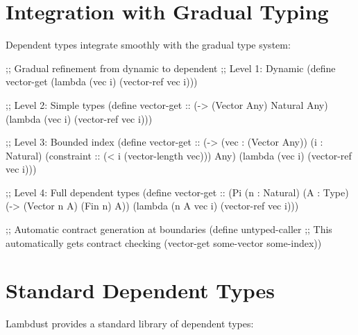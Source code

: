 \section{Integration with Gradual Typing}
\label{sec:dependent-gradual}


Dependent types integrate smoothly with the gradual type system:

\begin{example}
\begin{lambdustcode}
;; Gradual refinement from dynamic to dependent
;; Level 1: Dynamic  
(define vector-get 
  (lambda (vec i) (vector-ref vec i)))

;; Level 2: Simple types
(define vector-get :: (-> (Vector Any) Natural Any)
  (lambda (vec i) (vector-ref vec i)))

;; Level 3: Bounded index
(define vector-get :: (-> (vec : (Vector Any)) 
                          (i : Natural)  
                          (constraint :: (< i (vector-length vec)))
                          Any)
  (lambda (vec i) (vector-ref vec i)))

;; Level 4: Full dependent types
(define vector-get :: (Pi (n : Natural) (A : Type) 
                          (-> (Vector n A) (Fin n) A))
  (lambda (n A vec i) (vector-ref vec i)))

;; Automatic contract generation at boundaries
(define untyped-caller
  ;; This automatically gets contract checking
  (vector-get some-vector some-index))
\end{lambdustcode}
\end{example}

\section{Standard Dependent Types}
\label{sec:standard-dependent}

Lambdust provides a standard library of dependent types:

